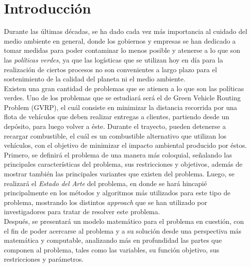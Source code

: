 \documentclass[letter, 10pt]{article}
\begin{document}
\section{Introducci\'on}


Durante las últimas décadas, se ha dado cada vez más importancia al cuidado del medio ambiente en general, donde los gobiernos y empresas se han dedicado a tomar medidas para poder contaminar lo menos posible y atenerse a lo que son las \emph{políticas verdes}, ya que las logísticas que se utilizan hoy en día para la realización de ciertos procesos no son convenientes a largo plazo para el sostenimiento de la calidad del planeta ni el medio ambiente.
\\

Existen una gran cantidad de problemas que se atienen a lo que son las políticas verdes. Uno de los problemas que se estudiará será el de Green Vehicle Routing Problem (GVRP), el cuál consiste en minimizar la distancia recorrida por una flota de vehículos que deben realizar entregas a clientes, partiendo desde un depósito, para luego volver a éste. Durante el trayecto, pueden detenerse a recargar combustible, el cuál es un combustible alternativo que utilizan los vehículos, con el objetivo de minimizar el impacto ambiental producido por éstos.
\\

Primero, se definirá el problema de una manera más coloquial, señalando las principales características del problema, sus restricciones y objetivos, además de mostrar también las principales variantes que existen del problema. Luego, se realizará el \emph{Estado del Arte} del problema, en donde se hará hincapié principalmente en los métodos y algoritmos más utilizados para este tipo de problema, mostrando los distintos \emph{approach} que se han utilizado por investigadores para tratar de resolver este problema.
\\

Después, se presentará un modelo matemático para el problema en cuestión, con el fin de poder acercarse al problema y a su solución desde una perspectiva más matemática y computable, analizando más en profundidad las partes que componen al problema, tales como las variables, su función objetivo, sus restricciones y parámetros.
\\
\end{document}
